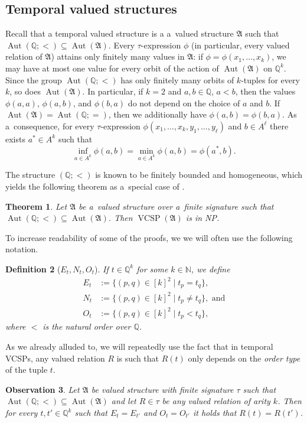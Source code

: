 \documentclass[preprint,12pt]{elsarticle}
\newcommand{\N}{\mathbb N}
\newcommand{\Q}{\mathbb Q}
\newcommand{\bA}{{\mathfrak A}}
\newcommand{\checked}[1]{#1}
\DeclareMathOperator{\Aut}{Aut}
\DeclareMathOperator{\VCSP}{VCSP}
\newtheorem{theorem}{Theorem}
\newtheorem{observation}[theorem]{Observation}
\newtheorem{definition}[theorem]{Definition}
\begin{document}
\subsection{Temporal valued structures}
Recall that a temporal valued \checked{structure} is a a~valued structure $\bA$ such that $\Aut(\Q; <) \subseteq \Aut(\bA)$. 
Every $\tau$-expression $\phi$ (in particular, every valued relation of $\bA$) attains only finitely many values in $\bA$: if $\phi = \phi(x_1, \dots, x_k)$, we may have at most one value for every orbit of the action of $\Aut(\bA)$ on $\Q^k$. Since the group $\Aut(\Q;<)$ has only finitely many orbits of $k$-tuples for every $k$, so does $\Aut(\bA)$. In particular, if $k=2$ and $a,b \in \Q$, $a<b$, then the values $\phi(a,a)$, $\phi(a,b)$, and $\phi(b,a)$ do not depend on the choice of $a$ and $b$. If $\Aut(\bA)=\Aut(\Q;=)$, then we additionally have $\phi(a,b)=\phi(b,a)$. 
As a~consequence, for every $\tau$-expression $\phi(x_1, \dots, x_k, y_1, \dots, y_\ell)$ and $b \in A^\ell$ there exists $a^* \in A^k$ such that \[\inf_{a \in A^k} \phi(a,b) = \min_{a \in A^k} \phi(a, b) =\phi(a^*, b).\]

The structure $(\Q;<)$ is known to be finitely bounded and homogeneous, which yields the following theorem as 
a~special case of \cite[Theorem 3.4]{Resilience-VCSPs}. 
\begin{theorem}\label{thm:NP}
Let $\bA$ be a~valued structure over a~finite signature such that $\Aut(\Q;<) \subseteq \Aut(\bA)$. Then $\VCSP(\bA)$ is in NP. 
\end{theorem}


To increase readability of some of the proofs, we
we will often use the following notation.
\begin{definition}[$E_t, N_t, O_t$]\label{def:E-N-O}
If $t \in \Q^k$ for some $k \in \N$, we define
\begin{align*}
E_t &:=\{(p,q) \in [k]^2 \mid t_p=t_q\},  \\
N_t &:=\{(p,q) \in [k]^2 \mid t_p\neq t_q\}, \text{ and} \\
O_t &:=\{(p,q) \in [k]^2 \mid t_p<t_q\},
\end{align*}
where $<$ is the natural order over $\Q$.
\end{definition}

As we already alluded to, we will repeatedly use the fact that in temporal VCSPs, any valued relation $R$ is such that $R(t)$ only depends on the \emph{order type} of the tuple $t$.
\begin{observation}\label{obs:order-type}
Let $\bA$ be valued structure with finite signature $\tau$ such that $\Aut(\Q;<) \subseteq \Aut(\bA)$ and let $R \in \tau$ be any valued relation of arity $k$.
Then for every $t, t' \in \Q^k$ such that $E_t = E_{t'}$ and $O_t = O_{t'}$ it holds that $R(t)=R(t')$.
\end{observation}
\end{document}
